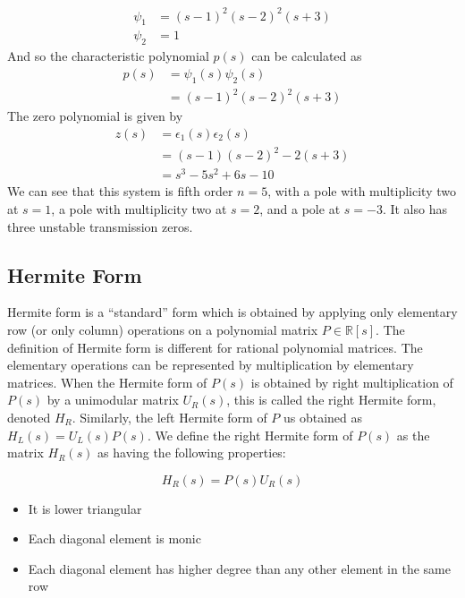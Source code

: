\begin{example}
\begin{equation*}
\begin{split}
      \psi_{1}&=(s-1)^{2}(s-2)^2(s+3) \\
      \psi_{2}&=1
    \end{split}
  \end{equation*}
  And so the characteristic polynomial $p(s)$ can be calculated as
  \begin{equation*}
    \begin{split}
      p(s)&=\psi_{1}(s)\psi_{2}(s) \\
      &=(s-1)^{2}(s-2)^2(s+3)
    \end{split}
  \end{equation*}
  The zero polynomial is given by
  \begin{equation*}
    \begin{split}
      z(s)&=\epsilon_{1}(s)\epsilon_{2}(s) \\
      &=(s-1)(s-2)^{2}-2(s+3) \\
      &=s^{3}-5s^{2}+6s-10
    \end{split}
  \end{equation*}
  We can see that this system is fifth order $n=5$, with a pole with multiplicity two at $s=1$, a pole with multiplicity two at $s=2$, and a pole at $s=-3$.
  It also has three unstable transmission zeros.
\end{example}

\subsection{Hermite Form}

Hermite form is a ``standard'' form which is obtained by applying only elementary row (or only column) operations on a polynomial matrix $P\in\mathbb{R}[s]$.
The definition of Hermite form is different for rational polynomial matrices.
The elementary operations can be represented by multiplication by elementary matrices.
When the Hermite form of $P(s)$ is obtained by right multiplication of $P(s)$ by a unimodular matrix $U_{R}(s)$, this is called the right Hermite form, denoted $H_{R}$.
Similarly, the left Hermite form of $P$ us obtained as $H_{L}(s)=U_{L}(s)P(s)$.
We define the right Hermite form of $P(s)$ as the matrix $H_{R}(s)$ as having the following properties:

\begin{equation*}
  H_{R}(s)=P(s)U_{R}(s)
\end{equation*}

\begin{itemize}
  \item{It is lower triangular}
  \item{Each diagonal element is monic}
  \item{Each diagonal element has higher degree than any other element in the same row}
\end{itemize}

